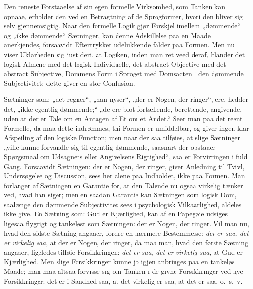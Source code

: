 \documentclass[12pt]{book}
\newcommand{\opage}[1]{\marginnote{\footnotesize\textit{[#1]}}}
\begin{document}
\opage{49}Den reneste Forstaaelse af sin egen formelle Virksomhed, som Tanken kan opnaae, erholder den ved en Betragtning af de Sprogformer, hvori den bliver sig selv gjennemsigtig. Naar den formelle Logik gjør Forskjel imellem „dømmende“ og „ikke dømmende“ Sætninger, kan denne Adskillelse paa en Maade anerkjendes, forsaavidt Eftertrykket udelukkende falder paa Formen. Men nu viser Uklarheden sig just deri, at Logiken, inden man ret veed deraf, blander det logisk Almene med det logisk Individuelle, det abstract Objective med det abstract Subjective, Dommens Form i Sproget med Domsacten i den dømmende Subjectivitet: dette giver en stor Confusion.

Sætninger som: „det regner“, „han nyser“, „der er Nogen, der ringer“, ere, hedder det, „ikke egentlig dømmende;“ „de ere blot fortællende, berettende, angivende, uden at der er Tale om en Antagen af Et om et Andet.“ Seer man paa det reent Formelle, da maa dette indrømmes, thi Formen er umiddelbar, og giver ingen klar Afspeiling af den logiske Function; men naar der saa tilføies, at slige Sætninger „ville kunne forvandle sig til egentlig dømmende, saasnart der opstaaer Spørgsmaal om Udsagnets eller Angivelsens Rigtighed“, saa er Forvirringen i fuld Gang. Forsaavidt Sætningen: der er Nogen, der ringer, giver Anledning til Tvivl, Undersøgelse og Discussion, sees her alene paa Indholdet, ikke paa Formen. Man forlanger af Sætningen en Garantie for, at den Talende nu ogsaa virkelig tænker ved, hvad han siger; men en saadan Garantie kan Sætningen som logisk Dom, saalænge den dømmende Subjectivitet sees i psychologisk Vilkaarlighed, aldeles ikke give. En Sætning som: Gud er Kjærlighed, kan af en Papegøie udsiges ligesaa flygtigt og tankeløst som Sætningen: der er Nogen, der ringer. Vil man nu, hvad den sidste Sætning angaaer, fordre en nærmere Bestemmelse: \emph{det er saa, det er virkelig saa}, at der er Nogen, der ringer, da maa man, hvad den første Sætning angaaer, ligeledes tilføie Forsikkringen: \emph{det er saa, det er virkelig saa}, at Gud er %
\opage{50}Kjærlighed. Men slige Forsikkringer kunne jo igjen anbringes paa en tankeløs Maade; man maa altsaa forvisse sig om Tanken i de givne Forsikkringer ved nye Forsikkringer: det er i Sandhed saa, at det virkelig er saa, at det er saa, o.~s.~v.
\end{document}
